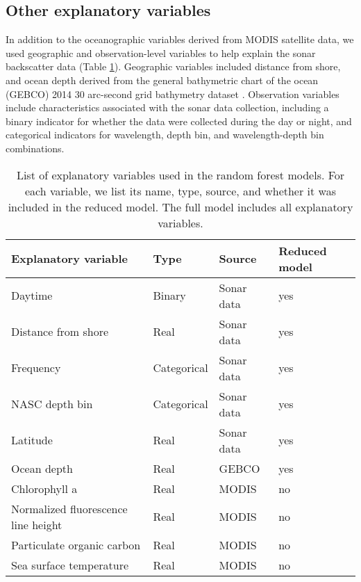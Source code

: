\documentclass[10pt,letterpaper]{article}
\begin{document}
\subsection*{Other explanatory variables}

In addition to the oceanographic variables derived from MODIS satellite data, we used geographic and observation-level variables to help explain the sonar backscatter data (Table \ref{tab:table1}).
Geographic variables included distance from shore, and ocean depth derived from the general bathymetric chart of the ocean (GEBCO) 2014 30 arc-second grid bathymetry dataset \cite{gebco}.
Observation variables include characteristics associated with the sonar data collection, including a binary indicator for whether the data were collected during the day or night, and categorical indicators for wavelength, depth bin, and wavelength-depth bin combinations.

\begin{table}
\caption{\label{tab:table1} List of explanatory variables used in the random forest models. For each variable, we list its name, type, source, and whether it was included in the reduced model. The full model includes all explanatory variables.}

\begin{tabular}{llll}
\footnotesize
\textbf{Explanatory variable}        & \textbf{Type} & \textbf{Source} & \textbf{Reduced model} \\
\hline
Daytime                              & Binary       & Sonar data       & yes                \\
Distance from shore                  & Real         & Sonar data       & yes                \\
Frequency                           & Categorical  & Sonar data       & yes                \\
NASC depth bin                       & Categorical  & Sonar data       & yes                \\
Latitude                             & Real         & Sonar data       & yes                \\
Ocean depth                      & Real         & GEBCO            & yes                \\
Chlorophyll a                        & Real         & MODIS            & no                \\
Normalized fluorescence line height  & Real         & MODIS            & no                \\
Particulate organic carbon           & Real         & MODIS            & no                \\
Sea surface temperature              & Real         & MODIS            & no
\end{tabular}
\end{table}
\end{document}
